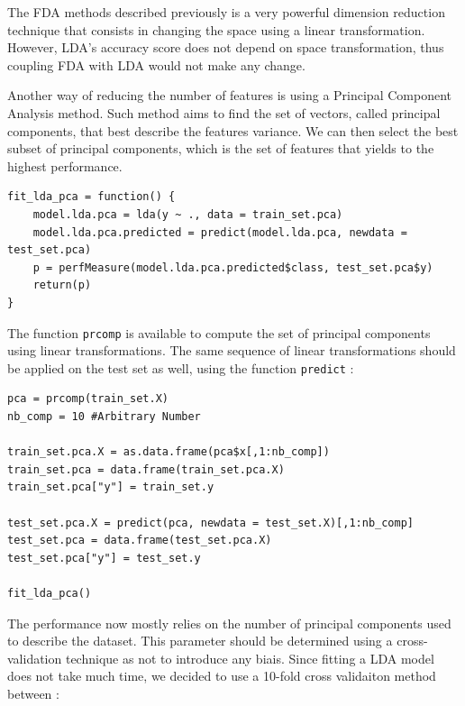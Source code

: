 \documentclass[]{report}
\begin{document}
The FDA methods described previously is a very powerful dimension reduction technique that consists in changing the space using a linear transformation. However, LDA's accuracy score does not depend on space transformation, thus coupling FDA with LDA would not make any change.

Another way of reducing the number of features is using a Principal Component Analysis method. Such method aims to find the set of vectors, called principal components, that best describe the features variance. We can then select the best subset of principal components, which is the set of features that yields to the highest performance.

\begin{lstlisting}
fit_lda_pca = function() {
	model.lda.pca = lda(y ~ ., data = train_set.pca)
	model.lda.pca.predicted = predict(model.lda.pca, newdata = test_set.pca)
	p = perfMeasure(model.lda.pca.predicted$class, test_set.pca$y)
	return(p)
}

\end{lstlisting}

The function \texttt{prcomp} is available to compute the set of principal components using linear transformations. The same sequence of linear transformations should be applied on the test set as well, using the function \texttt{predict} : 
\begin{lstlisting}
pca = prcomp(train_set.X)
nb_comp = 10 #Arbitrary Number

train_set.pca.X = as.data.frame(pca$x[,1:nb_comp])
train_set.pca = data.frame(train_set.pca.X)
train_set.pca["y"] = train_set.y

test_set.pca.X = predict(pca, newdata = test_set.X)[,1:nb_comp]
test_set.pca = data.frame(test_set.pca.X)
test_set.pca["y"] = test_set.y

fit_lda_pca()
\end{lstlisting}

The performance now mostly relies on the number of principal components used to describe the dataset. This parameter should be determined using a cross-validation technique as not to introduce any biais. Since fitting a LDA model does not take much time, we decided to use a 10-fold cross validaiton method between : 
\end{document}
